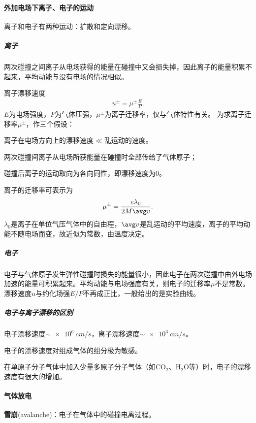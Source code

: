 \paragraph{外加电场下离子、电子的运动}
离子和电子有两种运动：扩散和定向漂移。

\subparagraph{离子}
两次碰撞之间离子从电场获得的能量在碰撞中又会损失掉，因此离子的能量积累不起来，平均动能与没有电场的情况相似。

离子漂移速度
\begin{align}
	u^\pm=\mu^\pm\frac EP.
\end{align}
$E$为电场强度，$P$为气体压强，$\mu^\pm$为离子迁移率，仅与气体特性有关。
为求离子迁移率$\mu^\pm$，作三个假设：
\begin{compactenum}
	\item 离子在电场方向上的漂移速度$\ll$乱运动的速度。
	\item 两次碰撞间离子从电场所获能量在碰撞时全部传给了气体原子；
	\item 碰撞后离子的运动取向为各向同性，即漂移速度为0。
\end{compactenum}
离子的迁移率可表示为
\[
	\mu^\pm=\frac{e\lambda_0}{2M\avg v}.
\]
$\lambda_0$是离子在单位气压气体中的自由程，$\avg v$是乱运动的平均速度，离子的平均动能不随电场而变，故近似为常数，由温度决定。

\subparagraph{电子}电子与气体原子发生弹性碰撞时损失的能量很小，因此电子在两次碰撞中由外电场加速的能量可积累起来。平均动能与电场强度有关，则电子的迁移率$\mu$不是常数。漂移速度$u$与约化场强$E/P$不再成正比，一般给出的是实验曲线。

\subparagraph{电子与离子漂移的区别}
\begin{compactenum}
	\item 电子漂移速度$\sim\SI{e6}{cm/s}$，离子漂移速度$\sim\SI{e3}{cm/s}$。
	\item 电子的漂移速度对组成气体的组分极为敏感。
	
	在单原子分子气体中加入少量多原子分子气体（如CO$_2$、H$_2$O等）时，电子的漂移速度有很大的增加。
\end{compactenum}
\paragraph{气体放电}
\textbf{雪崩}(avalanche)：电子在气体中的碰撞电离过程。

